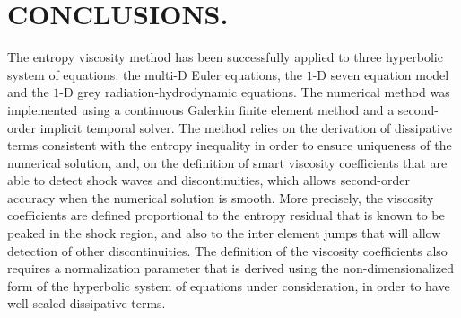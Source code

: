 %
%
%


\chapter{\uppercase {Conclusions.}}\label{chap:conclusion}
The entropy viscosity method has been successfully applied to three hyperbolic system of equations: the multi-D Euler equations, the $1$-D seven equation model and the $1$-D grey radiation-hydrodynamic equations. The numerical method was implemented using a continuous Galerkin finite element method and a second-order implicit temporal solver. The method relies on the derivation of dissipative terms consistent with the entropy inequality in order to ensure uniqueness of the numerical solution, and, on the definition of smart viscosity coefficients that are able to detect shock waves and discontinuities, which allows second-order accuracy when the numerical solution is smooth. More precisely, the viscosity coefficients are defined proportional to the entropy residual that is known to be peaked in the shock region, and also to the inter element jumps that will allow detection of other discontinuities. The definition of the viscosity coefficients also requires a normalization parameter that is derived using the non-dimensionalized form of the hyperbolic system of equations under consideration, in order to have well-scaled dissipative terms.

